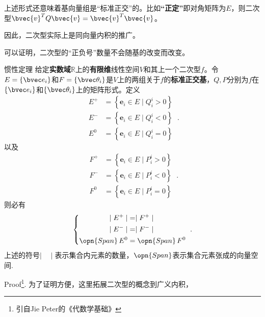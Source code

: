 上述形式还意味着基向量组是“标准正交”的。比如\textbf{“正定”}即对角矩阵为$E$，则二次型$\bvec{v}^{T}Q\bvec{v}=\bvec{v}^{T}\bvec{v}$。

因此，二次型实际上是同向量内积的推广。

可以证明，二次型的“正负号”数量不会随基的改变而改变。
\begin{theorem}{惯性定理}
给定\textbf{实数域}$\mathbb R$上的\textbf{有限维}线性空间$V$和其上一个二次型$f$。令$E=\{\bvec e_i\}$和$F=\{\bvec \theta_i\}$是$V$上的两组关于$f$的\textbf{标准正交基}，$Q,P$分别为$f$在$\{\bvec e_i\}$和$\{\bvec \theta_i\}$上的矩阵形式。定义
\begin{equation}
\begin{aligned}
E^{+} & =\left\{\mathbf{e}_i \in E \mid Q^i_i>0\right\} \\
E^{-} & =\left\{\mathbf{e}_i \in E \mid Q^i_i<0\right\} \\
E^0 & =\left\{\mathbf{e}_i \in E \mid Q^i_i=0\right\}
\end{aligned}~.
\end{equation}
以及
\begin{equation}
\begin{aligned}
F^{+} & =\left\{\mathbf{e}_i \in E \mid P^i_i>0\right\} \\
F^{-} & =\left\{\mathbf{e}_i \in E \mid P^i_i<0\right\} \\
F^0 & =\left\{\mathbf{e}_i \in E \mid P^i_i=0\right\}
\end{aligned}~.
\end{equation}
则必有
\begin{equation}
\left\{
\begin{aligned}
\mid E^{+}\mid&=\mid F^{+}\mid\\
\mid E^{-}\mid&=\mid F^{-}\mid\\
\opn{Span}\, E^{0}&=\opn{Span}\, F^{0}\\
\end{aligned}\right.~.
\end{equation}
上述的符号$\mid \quad\mid$表示集合内元素的数量，$\opn{Span}$表示集合元素张成的向量空间.
\end{theorem}
Proof\footnote{引自Jie Peter的《代数学基础》}.
为了证明方便，这里拓展二次型的概念到广义内积，